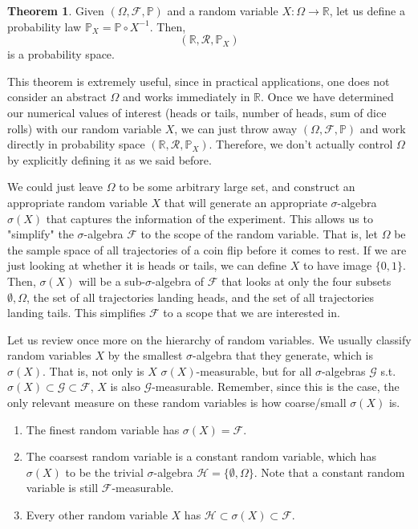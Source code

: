 \documentclass{article}
\theoremstyle{definition}
\newtheorem{theorem}{Theorem}[section]
\theoremstyle{remark}
\theoremstyle{definition}
\begin{document}
\begin{theorem}
Given $(\Omega, \mathcal{F}, \mathbb{P})$ and a random variable $X: \Omega \rightarrow \mathbb{R}$, let us define a probability law $\mathbb{P}_X = \mathbb{P} \circ X^{-1}$. Then, 
\[(\mathbb{R}, \mathcal{R}, \mathbb{P}_X)\]
is a probability space. 
\end{theorem}

This theorem is extremely useful, since in practical applications, one does not consider an abstract $\Omega$ and works immediately in $\mathbb{R}$. Once we have determined our numerical values of interest (heads or tails, number of heads, sum of dice rolls) with our random variable $X$, we can just throw away $(\Omega, \mathcal{F}, \mathbb{P})$ and work directly in probability space $(\mathbb{R}, \mathcal{R}, \mathbb{P}_X)$. Therefore, we don't actually control $\Omega$ by explicitly defining it as we said before. 

We could just leave $\Omega$ to be some arbitrary large set, and construct an appropriate random variable $X$ that will generate an appropriate $\sigma$-algebra $\sigma(X)$ that captures the information of the experiment. This allows us to "simplify" the $\sigma$-algebra $\mathcal{F}$ to the scope of the random variable. That is, let $\Omega$ be the sample space of all trajectories of a coin flip before it comes to rest. If we are just looking at whether it is heads or tails, we can define $X$ to have image $\{0, 1\}$. Then, $\sigma(X)$ will be a sub-$\sigma$-algebra of $\mathcal{F}$ that looks at only the four subsets $\emptyset, \Omega$, the set of all trajectories landing heads, and the set of all trajectories landing tails. This simplifies $\mathcal{F}$ to a scope that we are interested in. 

Let us review once more on the hierarchy of random variables. We usually classify random variables $X$ by the smallest $\sigma$-algebra that they generate, which is $\sigma(X)$. That is, not only is $X$ $\sigma(X)$-measurable, but for all $\sigma$-algebras $\mathcal{G}$ s.t. $\sigma(X) \subset \mathcal{G} \subset \mathcal{F}$, $X$ is also $\mathcal{G}$-measurable. Remember, since this is the case, the only relevant measure on these random variables is how coarse/small $\sigma(X)$ is. 
\begin{enumerate}
    \item The finest random variable has $\sigma(X) = \mathcal{F}$. 
    
    \item The coarsest random variable is a constant random variable, which has $\sigma(X)$ to be the trivial $\sigma$-algebra $\mathcal{H} = \{\emptyset, \Omega\}$. Note that a constant random variable is still $\mathcal{F}$-measurable. 
    
    \item Every other random variable $X$ has $\mathcal{H} \subset \sigma(X) \subset \mathcal{F}$. 
\end{enumerate}
\end{document}
